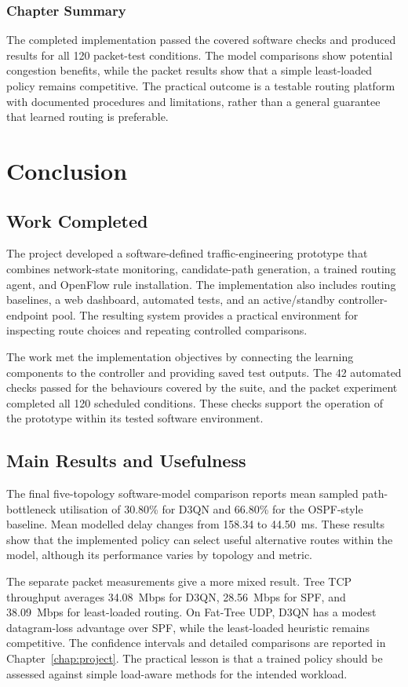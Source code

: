 \documentclass[12pt,a4paper,oneside]{report}
\begin{document}
\subsection{Chapter Summary}
The completed implementation passed the covered software checks and produced results for all 120 packet-test conditions. The model comparisons show potential congestion benefits, while the packet results show that a simple least-loaded policy remains competitive. The practical outcome is a testable routing platform with documented procedures and limitations, rather than a general guarantee that learned routing is preferable.


\chapter{Conclusion}
\label{chap:conclusion}

\section{Work Completed}
The project developed a software-defined traffic-engineering prototype that combines network-state monitoring, candidate-path generation, a trained routing agent, and OpenFlow rule installation. The implementation also includes routing baselines, a web dashboard, automated tests, and an active/standby controller-endpoint pool. The resulting system provides a practical environment for inspecting route choices and repeating controlled comparisons.

The work met the implementation objectives by connecting the learning components to the controller and providing saved test outputs. The 42 automated checks passed for the behaviours covered by the suite, and the packet experiment completed all 120 scheduled conditions. These checks support the operation of the prototype within its tested software environment.

\section{Main Results and Usefulness}
The final five-topology software-model comparison reports mean sampled path-bottleneck utilisation of 30.80\% for D3QN and 66.80\% for the OSPF-style baseline. Mean modelled delay changes from 158.34 to 44.50~ms. These results show that the implemented policy can select useful alternative routes within the model, although its performance varies by topology and metric.

The separate packet measurements give a more mixed result. Tree TCP throughput averages 34.08~Mbps for D3QN, 28.56~Mbps for SPF, and 38.09~Mbps for least-loaded routing. On Fat-Tree UDP, D3QN has a modest datagram-loss advantage over SPF, while the least-loaded heuristic remains competitive. The confidence intervals and detailed comparisons are reported in Chapter~\ref{chap:project}. The practical lesson is that a trained policy should be assessed against simple load-aware methods for the intended workload.
\end{document}
